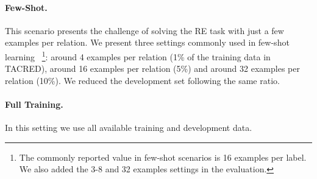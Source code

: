 \documentclass[11pt]{article}
\begin{document}
\begin{table*}[!ht]
    \centering
    \caption{Zero-Shot scenario results (Precision, Recall and F1) for our system using several pre-trained NLI models in two settings: no development  (default threshold =0.5), and small development (1\% Dev.) for setting . In the leftmost columns we report the number of parameters and the accuracy in MNLI. For the 1\% setting we report the median measures along with the F1 standard deviation in 100 runs. }
    \label{tab:zero_shot}
\end{table*}

\paragraph{Few-Shot.} This scenario presents the challenge of solving the RE task with just a few examples per relation. We present three settings commonly used in few-shot learning~\cite{gao2020making} \footnote{The commonly reported value in few-shot scenarios is 16 examples per label. We also added the 3-8 and 32 examples settings in the evaluation.}: around 4 examples per relation (1\% of the training data in TACRED), around 16 examples per relation (5\%) and around 32 examples per relation (10\%). We reduced the development set following the same ratio.

\paragraph{Full Training.} In this setting we use all available training and development data.
\end{document}
